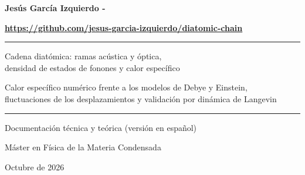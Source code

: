\documentclass[11pt,a4paper]{article}
\begin{document}
\begin{titlepage}
\centering
\vspace*{2.2cm}
{\LARGE\bfseries Jesús García Izquierdo -\par}
\vspace{6pt}
{\Large\bfseries\mbox{\href{https://github.com/jesus-garcia-izquierdo/diatomic-chain}{https://github.com/jesus-garcia-izquierdo/diatomic-chain}}\par}
\vspace{1.6cm}
\rule{0.75\textwidth}{0.6pt}\par\vspace{0.5cm}
{\Large Cadena diatómica: ramas acústica y óptica,\\[2pt]
densidad de estados de fonones y calor específico\par}
\vspace{0.3cm}
{\large Calor específico numérico frente a los modelos de Debye y Einstein,\\
fluctuaciones de los desplazamientos y validación por dinámica de Langevin\par}
\vspace{0.5cm}
\rule{0.75\textwidth}{0.6pt}\par
\vspace{1.4cm}
{\large Documentación técnica y teórica (versión en español)\par}
\vspace{0.3cm}
{\normalsize Máster en Física de la Materia Condensada\par}
\vfill
{\normalsize Octubre de 2026\par}
\end{titlepage}
\end{document}
